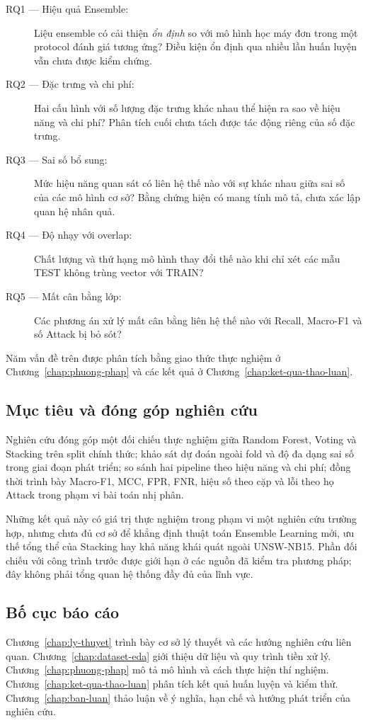 \begin{description}
\item[RQ1 --- Hiệu quả Ensemble:] Liệu ensemble có cải thiện \emph{ổn định} so với mô hình học máy đơn trong một protocol đánh giá tương ứng? Điều kiện ổn định qua nhiều lần huấn luyện vẫn chưa được kiểm chứng.
\item[RQ2 --- Đặc trưng và chi phí:] Hai cấu hình với số lượng đặc trưng khác nhau thể hiện ra sao về hiệu năng và chi phí? Phân tích cuối chưa tách được tác động riêng của số đặc trưng.
\item[RQ3 --- Sai số bổ sung:] Mức hiệu năng quan sát có liên hệ thế nào với sự khác nhau giữa sai số của các mô hình cơ sở? Bằng chứng hiện có mang tính mô tả, chưa xác lập quan hệ nhân quả.
\item[RQ4 --- Độ nhạy với overlap:] Chất lượng và thứ hạng mô hình thay đổi thế nào khi chỉ xét các mẫu TEST không trùng vector với TRAIN?
\item[RQ5 --- Mất cân bằng lớp:] Các phương án xử lý mất cân bằng liên hệ thế nào với Recall, Macro-F1 và số Attack bị bỏ sót?
\end{description}

Năm vấn đề trên được phân tích bằng giao thức thực nghiệm ở Chương~\ref{chap:phuong-phap} và các kết quả ở Chương~\ref{chap:ket-qua-thao-luan}.

\subsection{Mục tiêu và đóng góp nghiên cứu}
Nghiên cứu đóng góp một đối chiếu thực nghiệm giữa Random Forest, Voting và Stacking trên split chính thức; khảo sát dự đoán ngoài fold và độ đa dạng sai số trong giai đoạn phát triển; so sánh hai pipeline theo hiệu năng và chi phí; đồng thời trình bày Macro-F1, MCC, FPR, FNR, hiệu số theo cặp và lỗi theo họ Attack trong phạm vi bài toán nhị phân.

Những kết quả này có giá trị thực nghiệm trong phạm vi một nghiên cứu trường hợp, nhưng chưa đủ cơ sở để khẳng định thuật toán Ensemble Learning mới, ưu thế tổng thể của Stacking hay khả năng khái quát ngoài UNSW-NB15. Phần đối chiếu với công trình trước được giới hạn ở các nguồn đã kiểm tra phương pháp; đây không phải tổng quan hệ thống đầy đủ của lĩnh vực.

\subsection{Bố cục báo cáo}
Chương~\ref{chap:ly-thuyet} trình bày cơ sở lý thuyết và các hướng nghiên cứu liên quan. Chương~\ref{chap:dataset-eda} giới thiệu dữ liệu và quy trình tiền xử lý. Chương~\ref{chap:phuong-phap} mô tả mô hình và cách thực hiện thí nghiệm. Chương~\ref{chap:ket-qua-thao-luan} phân tích kết quả huấn luyện và kiểm thử. Chương~\ref{chap:ban-luan} thảo luận về ý nghĩa, hạn chế và hướng phát triển của nghiên cứu.
